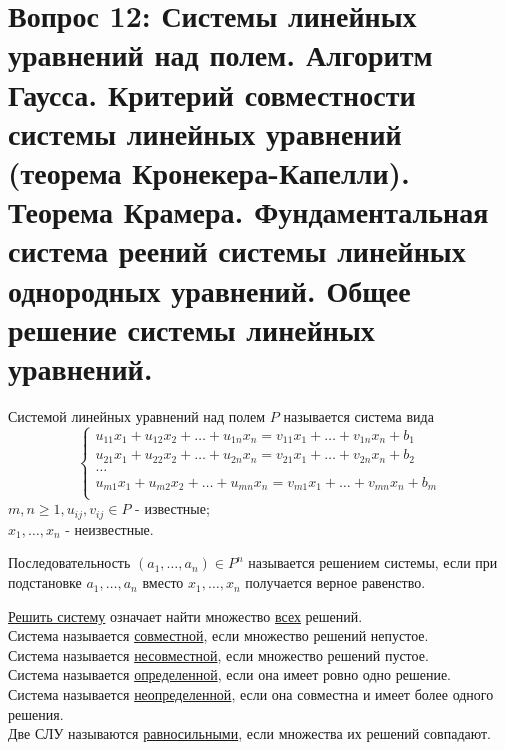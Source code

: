 \section{Вопрос 12: Системы линейных уравнений над полем.
Алгоритм Гаусса.
Критерий совместности системы линейных уравнений (теорема Кронекера-Капелли).
Теорема Крамера.
Фундаментальная система реений системы линейных однородных уравнений.
Общее решение системы линейных уравнений.}

\begin{defs}
  Системой линейных уравнений над полем $P$ называется система вида
  \begin{equation*}
    \begin{cases}
      u_{11}x_1 + u_{12}x_2 + \ldots + u_{1n}x_n = v_{11}x_1 + \ldots + v_{1n}x_n + b_1 \\
      u_{21}x_1 + u_{22}x_2 + \ldots + u_{2n}x_n = v_{21}x_1 + \ldots + v_{2n}x_n + b_2 \\
      \ldots \\
      u_{m1}x_1 + u_{m2}x_2 + \ldots + u_{mn}x_n = v_{m1}x_1 + \ldots + v_{mn}x_n + b_m \\
    \end{cases}
  \end{equation*}
  $m,n \geqslant 1, u_{ij}, v_{ij} \in P$ - известные; \\
  $x_1, \ldots, x_n$ - неизвестные.
\end{defs}

\begin{defs}
  Последовательность $(a_1, \ldots, a_n) \in P^n$ называется решением системы, если
  при подстановке $a_1, \ldots, a_n$ вместо $x_1, \ldots, x_n$ получается верное равенство.
\end{defs}

\begin{defs}
\underline{Решить систему} означает найти множество \underline{всех} решений. \\
Система называется \underline{совместной}, если множество решений непустое. \\
Система называется \underline{несовместной}, если множество решений пустое. \\
Система называется \underline{определенной}, если она имеет ровно одно решение. \\
Система называется \underline{неопределенной}, если она совместна и имеет более одного решения. \\
Две СЛУ называются \underline{равносильными}, если множества их решений совпадают. \\
\end{defs}

